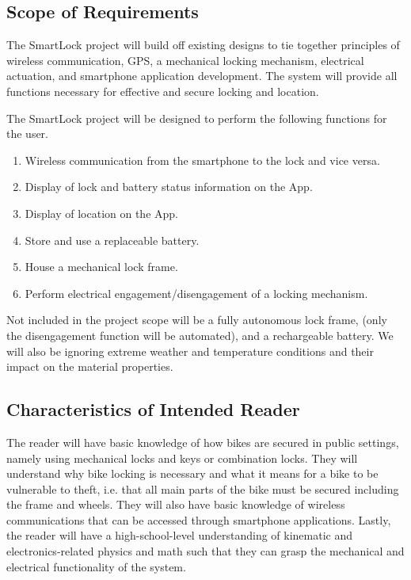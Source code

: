 \documentclass[12pt]{article}
\begin{document}
\subsection{Scope of Requirements} 

The SmartLock project will build off existing designs to tie together principles of wireless communication, GPS, a mechanical locking mechanism, electrical actuation, and smartphone application development. The system will provide all functions necessary for effective and secure locking and location.  

The SmartLock project will be designed to perform the following functions for the user.  

\begin{enumerate}
\item Wireless communication from the smartphone to the lock and vice versa. 
\item Display of lock and battery status information on the App. 
\item Display of location on the App. 
\item Store and use a replaceable battery. 
\item House a mechanical lock frame. 
\item Perform electrical engagement/disengagement of a locking mechanism. 
\end{enumerate}

Not included in the project scope will be a fully autonomous lock frame, (only the disengagement function will be automated), and a rechargeable battery. We will also be ignoring extreme weather and temperature conditions and their impact on the material properties.

\subsection{Characteristics of Intended Reader} \label{sec_IntendedReader}

The reader will have basic knowledge of how bikes are secured in public settings, namely using mechanical locks and keys or combination locks. They will understand why bike locking is necessary and what it means for a bike to be vulnerable to theft, i.e. that all main parts of the bike must be secured including the frame and wheels. They will also have basic knowledge of wireless communications that can be accessed through smartphone applications. Lastly, the reader will have a high-school-level understanding of kinematic and electronics-related physics and math such that they can grasp the mechanical and electrical functionality of the system.  
\end{document}

